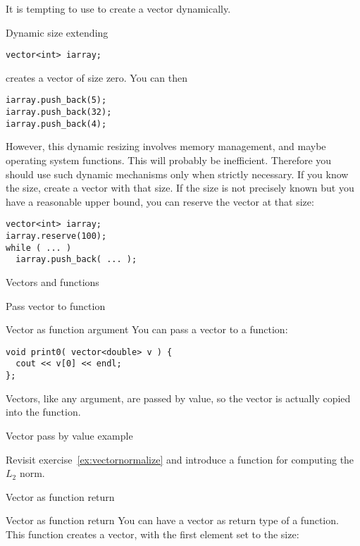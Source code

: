 It is tempting to use  to create a vector dynamically.

\begin{block}{Dynamic size extending}
  \label{sl:vector-extend}
\begin{lstlisting}
vector<int> iarray;
\end{lstlisting}
creates a vector of size zero. You can then
\begin{lstlisting}
iarray.push_back(5);
iarray.push_back(32);
iarray.push_back(4);
\end{lstlisting}
\end{block}

However, this dynamic resizing involves memory management, and maybe
operating system functions. This will probably be
inefficient. Therefore you should use such dynamic mechanisms only
when strictly necessary.
If you know the size,
create a vector with that size. If the size is not precisely known but
you have a reasonable upper bound, you can 
reserve the vector at that size:
\begin{lstlisting}
vector<int> iarray;
iarray.reserve(100);
while ( ... )
  iarray.push_back( ... );
\end{lstlisting}

 {Vectors and functions}

 {Pass vector to function}

\begin{block}{Vector as function argument}
  \label{sl:vector-arg}
  You can pass a vector to a function:
\begin{lstlisting}
void print0( vector<double> v ) {
  cout << v[0] << endl;
};
\end{lstlisting}
Vectors, like any argument, are passed by value, so the vector is
actually copied into the function.
\end{block}

\begin{block}{Vector pass by value example}
  \label{sl:vector-arg-ex}
\end{block}

\begin{exercise}
  \label{ex:vectornormalize-function}
  Revisit exercise~\ref{ex:vectornormalize} and introduce a function
  for computing the $L_2$ norm.
\end{exercise}

 {Vector as function return}

\begin{block}{Vector as function return}
  \label{sl:vector-return}
  You can have a vector as return type of a function. This function
  creates a vector, with the first element set to the size:
\end{block}

